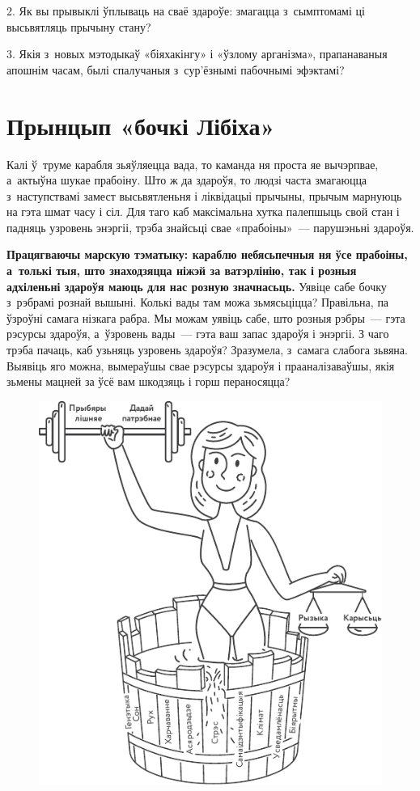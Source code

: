 2. Як вы прывыклі ўплываць на сваё здароўе: змагацца з~сымптомамі ці высьвятляць прычыну стану?

3. Якія з~новых мэтодыкаў «біяхакінгу» і «ўзлому арганізма», прапанаваныя апошнім часам, былі спалучаныя з~сур'ёзнымі пабочнымі эфэктамі?


\section{Прынцып «бочкі Лібіха»}

Калі ў~труме карабля зьяўляецца вада, то каманда ня проста яе вычэрпвае, а~актыўна шукае прабоіну. Што ж да здароўя, то людзі часта змагаюцца з~наступствамі замест высьвятленьня і ліквідацыі прычыны, прычым марнуюць на гэта шмат часу і сіл. Для таго каб максімальна хутка палепшыць свой стан і падняць узровень энэргіі, трэба знайсьці свае «прабоіны»~--- парушэньні здароўя.

\textbf{Працягваючы марскую тэматыку: караблю небясьпечныя ня ўсе прабоіны, а~толькі тыя, што знаходзяцца ніжэй за ватэрлінію, так і розныя адхіленьні здароўя маюць для нас розную значнасьць.} Уявіце сабе бочку з~рэбрамі рознай вышыні. Колькі вады там можа зьмясьціцца? Правільна, па ўзроўні самага нізкага рабра. Мы можам уявіць сабе, што розныя рэбры~--- гэта рэсурсы здароўя, а~ўзровень вады~--- гэта ваш запас здароўя і энэргіі. З чаго трэба пачаць, каб узьняць узровень здароўя? Зразумела, з~самага слабога зьвяна. Выявіць яго можна, вымераўшы свае рэсурсы здароўя і прааналізаваўшы, якія зьмены мацней за ўсё вам шкодзяць і горш пераносяцца?

\begin{figure}[htb!]
  \centering
  \includegraphics[scale=1.5]{willpower/ch3/12.pdf}
\end{figure}

